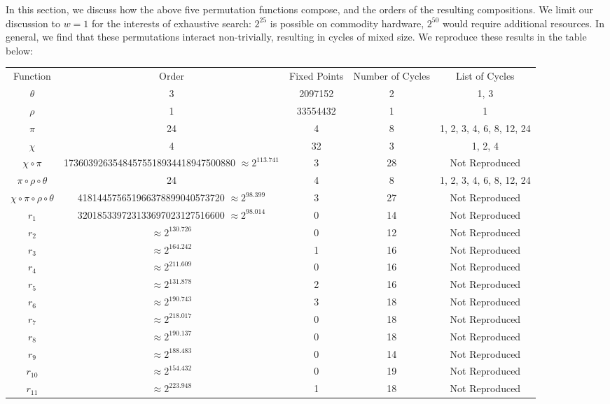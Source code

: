 \documentclass[10pt,twocolumn,twoside]{pnas-new}
\begin{document}
In this section, we discuss how the above five permutation functions compose,
and the orders of the resulting compositions. We limit our discussion to $w=1$
for the interests of exhaustive search: $2^{25}$ is possible on commodity
hardware, $2^{50}$ would require additional resources. In general, we find that
these permutations interact non-trivially, resulting in cycles of mixed size.
We reproduce these results in the table below:

\begin{tabular}{c c c c c} \label{tab:p:c:1}
    Function & Order & Fixed Points & Number of Cycles & List of Cycles \\
    $\theta$ & 3 & 2097152 & 2 & 1, 3 \\
    $\rho$ & 1 & 33554432 & 1 & 1 \\
    $\pi$ & 24 & 4 & 8 & 1, 2, 3, 4, 6, 8, 12, 24 \\
    $\chi$ & 4 & 32 & 3 & 1, 2, 4 \\
    $\chi \circ \pi$ & 17360392635484575518934418947500880 $\approx 2^{113.741}$ & 3 & 28 & Not Reproduced \\
    $\pi \circ \rho \circ \theta$ & 24 & 4 & 8 & 1, 2, 3, 4, 6, 8, 12, 24 \\
    $\chi \circ \pi \circ \rho \circ \theta$ & 418144575651966378899040573720 $\approx 2^{98.399}$ & 3 & 27 & Not Reproduced \\
    $r_1$ & 320185339723133697023127516600 $\approx 2^{98.014}$ & 0 & 14 & Not Reproduced \\
    $r_2$ & $\approx 2^{130.726}$ & 0 & 12 & Not Reproduced \\
    $r_3$ & $\approx 2^{164.242}$ & 1 & 16 & Not Reproduced \\
    $r_4$ & $\approx 2^{211.609}$ & 0 & 16 & Not Reproduced \\
    $r_5$ & $\approx 2^{131.878}$ & 2 & 16 & Not Reproduced \\
    $r_6$ & $\approx 2^{190.743}$ & 3 & 18 & Not Reproduced \\
    $r_7$ & $\approx 2^{218.017}$ & 0 & 18 & Not Reproduced \\
    $r_8$ & $\approx 2^{190.137}$ & 0 & 18 & Not Reproduced \\
    $r_9$ & $\approx 2^{188.483}$ & 0 & 14 & Not Reproduced \\
    $r_{10}$ & $\approx 2^{154.432}$ & 0 & 19 & Not Reproduced \\
    $r_{11}$ & $\approx 2^{223.948}$ & 1 & 18 & Not Reproduced \\

\end{tabular}
\end{document}
